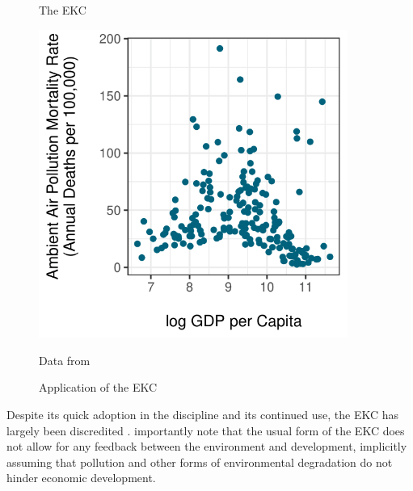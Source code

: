 \begin{figure}
\centering
\begin{minipage}{0.48 \textwidth}
\caption{The EKC \label{EKC}}
\end{minipage}
\begin{minipage}{0.48\textwidth}
\centering 
\caption{Application of the  EKC}
\includegraphics[width=0.9\textwidth]{figures/chapter2_figures/ekc.png}
\end{minipage}
Data from \cite{owidoutdoorairpollution} 
\end{figure}

Despite its quick adoption in the discipline and its continued use, the EKC has largely been discredited \citep{stern2004rise}. \cite{arrow1995economic} importantly note that the usual form of the EKC does not allow for any feedback between the environment and development, implicitly assuming that pollution and other forms of environmental degradation do not hinder economic development. 

